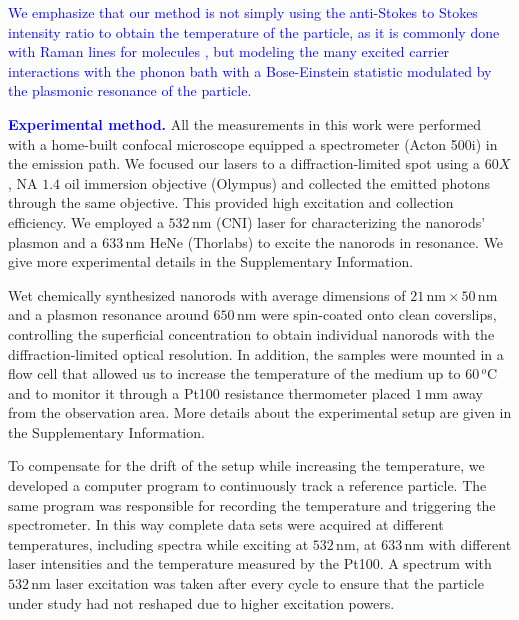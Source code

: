 \documentclass[journal=nalefd,manuscript=letter]{achemso}
\newcommand{\HI}[1]{\textcolor{blue}{#1}} %
\newcommand{\nm}{\ensuremath{\,\textrm{nm}}}
\newcommand{\mm}{\ensuremath{\,\textrm{mm}}}
\newcommand{\degree}{\ensuremath{\,^o\textrm{C}}}
\begin{document}
\HI{We emphasize that our method is not simply using the anti-Stokes to Stokes intensity ratio to 
obtain the temperature of the particle, as it is commonly done with Raman lines for molecules 
\cite{krishnan1928influence,zondervan2006single}, but modeling the many excited carrier interactions
with the phonon bath with a Bose-Einstein statistic modulated by the plasmonic resonance of the particle.}

\HI{\textbf{Experimental method.}} All the measurements in this work were performed with a home-built confocal
microscope equipped a spectrometer (Acton 500i) in the emission path.  We focused
our lasers to a diffraction-limited spot using a $60X$, NA $1.4$ oil immersion
objective (Olympus) and collected the emitted photons through the same
objective. This provided high excitation and collection efficiency.
We employed a $532\nm$ (CNI) laser for characterizing the nanorods' plasmon and
a $633\nm$ HeNe (Thorlabs) to excite the nanorods in resonance.
We give more experimental details in the Supplementary Information.

Wet chemically synthesized nanorods\cite{Nikoobakht2003} with average dimensions
of $21\nm\times50\nm$ and a plasmon resonance around $650\nm$ were spin-coated
onto clean coverslips, controlling the superficial concentration to obtain
individual nanorods with the diffraction-limited optical resolution.
In addition, the samples were mounted in a flow cell that allowed us to increase
the temperature of the medium up to $60\degree$ and to monitor it through a
Pt100 resistance thermometer placed $1\mm$ away from the observation area. More
details about the experimental setup are given in the Supplementary Information.

To compensate for the drift of the setup while increasing the temperature, we
developed a computer program to continuously track a reference particle. The
same program was responsible for recording the temperature and triggering the
spectrometer. In this way complete data sets were acquired at different
temperatures, including spectra while exciting at $532\nm$, at $633\nm$ with
different laser intensities and the temperature measured by the Pt100. A
spectrum with $532\nm$ laser excitation was taken after every cycle to ensure
that the particle under study had not reshaped due to higher excitation powers.
\end{document}
